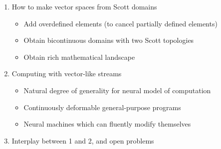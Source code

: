 \documentclass{beamer}
\newcommand{\msgray}[1]{{\color{mygray} #1}}
\begin{document}
\begin{frame}

\begin{enumerate}

  \item How to make vector spaces from Scott domains

  \begin{itemize}
      \item \msgray{Add overdefined elements (to cancel partially defined elements)}
      \item \msgray{Obtain bicontinuous domains with two Scott topologies}
      \item \msgray{Obtain rich mathematical landscape}
  \end{itemize}

  \vspace{2ex}

  \item Computing with vector-like streams

  \begin{itemize}
      \item \msgray{Natural degree of generality for neural model of computation}
      \item \msgray{Continuously deformable general-purpose programs}
      \item \msgray{Neural machines which can fluently modify themselves}

  \end{itemize}

  \vspace{2ex}

  \item Interplay between 1 and 2, and open problems

\end{enumerate}

\end{frame}
\end{document}
